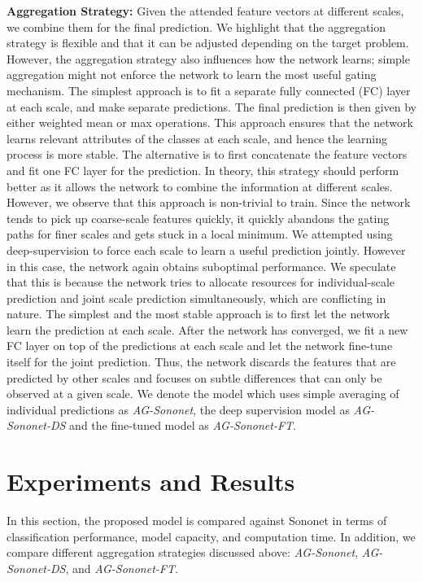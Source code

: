 \documentclass{article}
\begin{document}
\textbf{Aggregation Strategy:} Given the attended feature vectors at different scales, we combine them for the final prediction. We highlight that the aggregation strategy is flexible and that it can be adjusted depending on the target problem. However, the aggregation strategy also influences how the network learns; simple aggregation might not enforce the network to learn the most useful gating mechanism. The simplest approach is to fit a separate fully connected (FC) layer at each scale, and make separate predictions. The final prediction is then given by either weighted mean or max operations. This approach ensures that the network learns relevant attributes of the classes at each scale, and hence the learning process is more stable. The alternative is to first concatenate the feature vectors and fit one FC layer for the prediction. In theory, this strategy should perform better as it allows the network to combine the information at different scales. However, we observe that this approach is non-trivial to train. Since the network tends to pick up coarse-scale features quickly, it quickly abandons the gating paths for finer scales and gets stuck in a local minimum. We attempted using deep-supervision \cite{lee2015deeply} to force each scale to learn a useful prediction jointly. However in this case, the network again obtains suboptimal performance. We speculate that this is because the network tries to allocate resources for individual-scale prediction and joint scale prediction simultaneously, which are conflicting in nature. The simplest and the most stable approach is to first let the network learn the prediction at each scale. After the network has converged, we fit a new FC layer on top of the predictions at each scale and let the network fine-tune itself for the joint prediction. Thus, the network discards the features that are predicted by other scales and focuses on subtle differences that can only be observed at a given scale. We denote the model which uses simple averaging of individual predictions as \emph{AG-Sononet}, the deep supervision model as \emph{AG-Sononet-DS} and the fine-tuned model as \emph{AG-Sononet-FT}.

\section{Experiments and Results}

In this section, the proposed model is compared against Sononet in terms of classification performance, model capacity, and computation time. In addition, we compare different aggregation strategies discussed above: \emph{AG-Sononet}, \emph{AG-Sononet-DS}, and \emph{AG-Sononet-FT}.
\end{document}
